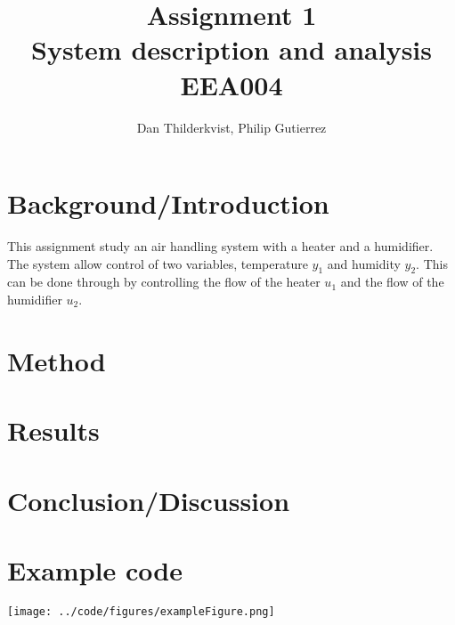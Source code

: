 \documentclass[a4paper, titlepage]{article}
\title{Assignment 1\\
System description and analysis\\
\large EEA004}
\author{Dan Thilderkvist, Philip Gutierrez}
\begin{document}
\maketitle

\section{Background/Introduction}
This assignment study an air handling system with a heater and a humidifier.
The system allow control of two variables, temperature $y_1$ and humidity $y_2$.
This can be done through by controlling the flow of the heater $u_1$ and the flow of the humidifier $u_2$.

\section{Method}


\section{Results}


\section{Conclusion/Discussion}


\section{Example code}

\texttt{[image: ../code/figures/exampleFigure.png]}


\end{document}
